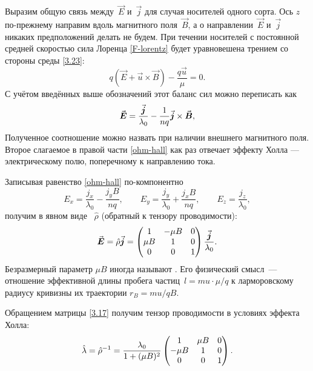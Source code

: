 Выразим общую связь между~$\vec{E}$ и~$\vec{j}$ для случая носителей одного сорта.
Ось $z$ по-прежнему направим вдоль магнитного поля~$\vec{B}$, а о
направлении~$\vec{E}$ и~$\vec{j}$ никаких предположений делать не будем.
При течении носителей с постоянной средней скоростью сила Лоренца
\eqref{F-lorentz} будет уравновешена трением со стороны среды \eqref{3.23}:
\begin{equation*}
    q(\vec{E}+\vec{u}\times \vec{B}) - \frac{q\vec{u}}{\mu} =0.
\end{equation*}
С учётом введённых выше обозначений этот баланс сил можно переписать как
\begin{equation}
    \eqmark{ohm-hall}
    \vec{E} = \frac{\vec{j}}{\lambda_0} -
    \frac{1}{nq} \vec{j}\times\vec{B},
\end{equation}
Полученное соотношение можно назвать  при
наличии внешнего магнитного поля. Второе слагаемое в правой части \eqref{ohm-hall}
как раз отвечает эффекту Холла --- электрическому полю, поперечному к
направлению тока.

Записывая равенство \eqref{ohm-hall} по-компонентно
\[
E_x = \frac{j_x}{\lambda_0}  -  \frac{j_y B}{nq} ,\qquad
    E_y = \frac{j_y}{\lambda_0} +  \frac{j_xB}{nq} ,\qquad
    E_z = \frac{j_z}{\lambda_0},
\]
получим в явном виде
~$\hat{\rho}$ (обратный к тензору
проводимости):
\begin{equation}
    \vec{E}=\hat{\rho}\vec{j}= \left(
    \begin{matrix}
        1 & -\mu B & {0} \\
        \mu B & 1 & {0} \\
        {0} &{0}& 1
    \end{matrix}
    \right)
    \frac{\vec{j}}{\lambda_0}.
    \eqmark{3.17}
\end{equation}
Безразмерный параметр $\mu B$ иногда называют . 
Его физический смысл~--- отношение эффективной длины пробега частиц~$l=mu\cdot \mu/q$
к ларморовскому радиусу кривизны их траектории $r_B=mu/qB$.

Обращением матрицы \eqref{3.17} получим тензор проводимости
в условиях эффекта Холла:
\begin{equation}
    \hat{\lambda} = \hat{\rho}^{-1}=
    \frac{\lambda_0}{1+(\mu B)^2}\left(
    \begin{matrix}
        {1} & \mu B & {0} \\
        -\mu B & 1 & {0} \\
        {0} &{0}& 1 \\
    \end{matrix}
    \right).
    \eqmark{3.18}
\end{equation}


